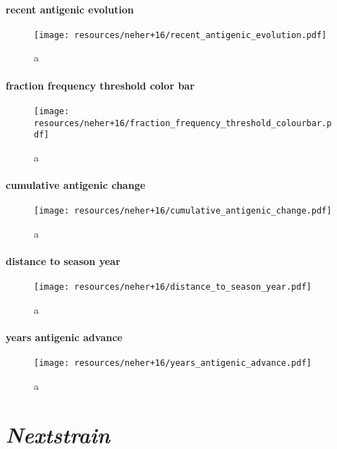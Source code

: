 \documentclass{beamer}
\begin{document}
\begin{darkframes}
    \begin{frame}{\subsecname}
      \framesubtitle{recent antigenic evolution}
      \begin{figure}
        \texttt{[image: resources/neher+16/recent\_antigenic\_evolution.pdf]}
        \caption{\footnotesize a}
      \end{figure}
    \end{frame}

    \begin{frame}{\subsecname}
      \framesubtitle{fraction frequency threshold color bar}
      \begin{figure}
        \texttt{[image: resources/neher+16/fraction\_frequency\_threshold\_colourbar.pdf]}
        \caption{\footnotesize a}
      \end{figure}
    \end{frame}

    \begin{frame}{\subsecname}
      \framesubtitle{cumulative antigenic change}
      \begin{figure}
        \texttt{[image: resources/neher+16/cumulative\_antigenic\_change.pdf]}
        \caption{\footnotesize a}
      \end{figure}
    \end{frame}
    
    \begin{frame}{\subsecname}
      \framesubtitle{distance to season year}
      \begin{figure}
        \texttt{[image: resources/neher+16/distance\_to\_season\_year.pdf]}
        \caption{\footnotesize a}
      \end{figure}
    \end{frame}


    \begin{frame}{\subsecname}
      \framesubtitle{years antigenic advance}
      \begin{figure}
        \texttt{[image: resources/neher+16/years\_antigenic\_advance.pdf]}
        \caption{\footnotesize a}
      \end{figure}
    \end{frame}









  \section{\textit{Nextstrain}}


\end{darkframes}
\end{document}
